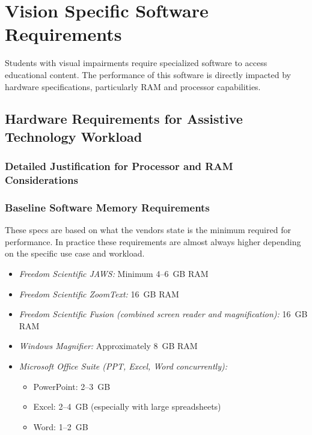 \hypertarget{vision-specific-software-requirements}{}\section{Vision Specific Software Requirements}\label{vision-specific-software-requirements}

Students with visual impairments require specialized software to access educational content. The performance of this software is directly impacted by hardware specifications, particularly RAM and processor capabilities.

\subsection{Hardware Requirements for Assistive Technology Workload}\label{hardware-justification-ai-ram}

\subsubsection{Detailed Justification for Processor and RAM Considerations}

\subsubsection{Baseline Software Memory Requirements}
These  specs are based on what the vendors state is the minimum required for performance. In practice these requirements are almost always higher depending on the specific use case and workload.

\begin{itemize}
	\item \emph{Freedom Scientific JAWS:} Minimum 4--6~GB RAM \supercite{FreedomScientificJAWSRequirements}
	\item \emph{Freedom Scientific ZoomText:} 16~GB RAM \supercite{FreedomScientificZoomTextRequirements}
	\item \emph{Freedom Scientific Fusion (combined screen reader and magnification):} 16~GB RAM \supercite{FreedomScientificFusionRequirements}
	\item \emph{Windows Magnifier:} Approximately 8~GB RAM \supercite{MicrosoftWindowsAccessibility}
	\item \emph{Microsoft Office Suite (PPT, Excel, Word concurrently):} \supercite{MicrosoftOfficeSystemRequirements}

	      \begin{itemize}
		      \item PowerPoint: 2--3~GB
		      \item Excel: 2--4~GB (especially with large spreadsheets)
		      \item Word: 1--2~GB
	      \end{itemize}

\end{itemize}


